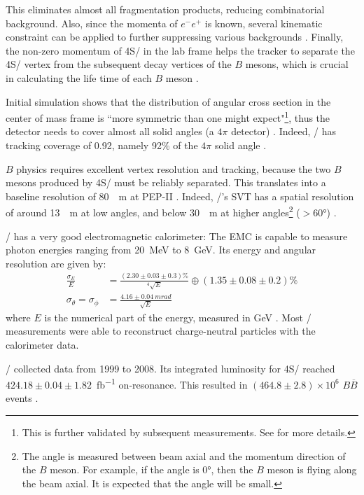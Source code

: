 This eliminates almost all fragmentation products, reducing combinatorial
background.
Also, since the momenta of $e^- e^+$ is known, several kinematic constraint
can be applied to further suppressing various
backgrounds \cite{Harrison:1998yr}.
Finally, the non-zero momentum of \Y4S/ in the lab frame helps the tracker to
separate the \Y4S/ vertex from the subsequent decay vertices of the $B$ mesons,
which is crucial in calculating the life time of each $B$
meson \cite{McGregor:2008ek}.

Initial simulation shows that the distribution of angular cross section in the
center of mass frame is ``more symmetric than one might expect"\footnote{
    This is further validated by subsequent measurements.
    See \cite{McGregor:2008ek} for more details.
}, thus the detector needs to cover almost all solid angles
(a $4\pi$ detector) \cite{Boutigny:1995ib}.
Indeed, \BaBar/ has tracking coverage of 0.92, namely 92\% of the $4\pi$ solid
angle \cite{Harrison:1998yr}.

$B$ physics requires excellent vertex resolution and tracking, because the two
$B$ mesons produced by \Y4S/ must be reliably separated.
This translates into a baseline resolution of \SI{80}{\mu m} at
PEP-II \cite{Harrison:1998yr}.
Indeed, \BaBar/'s SVT has a spatial resolution of around \SI{13}{\mu m} at low
angles, and below \SI{30}{\mu m} at higher angles\footnote{
    The angle is measured between beam axial and the momentum direction of the
    $B$ meson.
    For example, if the angle is \ang{0}, then the $B$ meson is flying along the
    beam axial.
    It is expected that the angle will be small.
}
($> \ang{60}$) \cite{Harrison:1998yr}.

\BaBar/ has a very good electromagnetic calorimeter:
The EMC is capable to measure photon energies ranging from \SI{20}{MeV} to
\SI{8}{GeV}.
Its energy and angular resolution are given by:
\begin{align*}
    \frac{\sigma_E}{E} &= \frac{(2.30 \pm 0.03 \pm 0.3)\%}{^{4}\sqrt{E}}
    \oplus (1.35 \pm 0.08 \pm 0.2)\% \\
    \sigma_{\theta} = \sigma_{\phi} &= \frac{{4.16 \pm 0.04}~\si{mrad}}
        {\sqrt{E}}
\end{align*}
where $E$ is the numerical part of the energy, measured in
\si{GeV} \cite{Bauer:2005}.
Most \BaBar/ measurements were able to reconstruct charge-neutral particles with
the calorimeter data.

\BaBar/ collected data from 1999 to 2008. Its integrated luminosity for \Y4S/
reached $424.18 \pm 0.04 \pm 1.82$~\si{fb^{-1}} on-resonance.
This resulted in $(464.8 \pm 2.8) \times 10^6$ $B \overline{B}$
events \cite{Lees:2013rw}.
